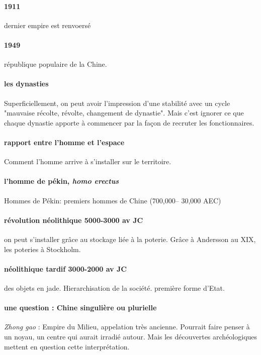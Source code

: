\paragraph{1911} dernier empire est renvoersé
\paragraph{1949} république populaire de la Chine.


\paragraph{les dynasties} Superficiellement, on peut avoir l'impression d'une stabilité avec un cycle "mauvaise récolte, révolte, changement de dynastie". Mais c'est ignorer ce que chaque dynastie apporte à commencer par la façon de recruter les fonctionnaires.


\paragraph{rapport entre l'homme et l'espace} Comment l'homme arrive à s'installer sur le territoire. 

\paragraph{l'homme de pékin, \textit{homo erectus}} Hommes de Pékin: premiers hommes de Chine (700,000– 30,000 AEC)

\paragraph{révolution néolithique 5000-3000 av JC} on peut s'installer grâce au stockage liée à la poterie.
Grâce à Andersson au XIX, les poteries à Stockholm.

\paragraph{néolithique tardif 3000-2000 av JC} des objets en jade. Hierarchisation de la société. première forme d'Etat.


\paragraph{une question : Chine singulière ou plurielle} \textit{Zhong gao} : Empire du Milieu, appelation très ancienne. Pourrait faire penser à un noyau, un centre qui aurait irradié autour. Mais les découvertes archéologiques mettent en question cette interprétation. 


